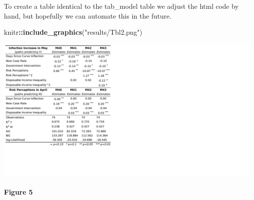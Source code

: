 \documentclass[
]{article}
\newenvironment{Shaded}{\begin{snugshade}}{\end{snugshade}}
\newcommand{\KeywordTok}[1]{\textcolor[rgb]{0.13,0.29,0.53}{\textbf{#1}}}
\newcommand{\NormalTok}[1]{#1}
\newcommand{\OperatorTok}[1]{\textcolor[rgb]{0.81,0.36,0.00}{\textbf{#1}}}
\newcommand{\StringTok}[1]{\textcolor[rgb]{0.31,0.60,0.02}{#1}}
\begin{document}
To create a table identical to the tab\_model table we adjust the html
code by hand, but hopefully we can automate this in the future.

\begin{Shaded}
\begin{Highlighting}[]
\NormalTok{knitr}\OperatorTok{::}\KeywordTok{include_graphics}\NormalTok{(}\StringTok{"results/Tbl2.png"}\NormalTok{)}
\end{Highlighting}
\end{Shaded}

\includegraphics[width=20in]{results/Tbl2}

\hypertarget{figure-5}{%
\paragraph{Figure 5}\label{figure-5}}
\end{document}
